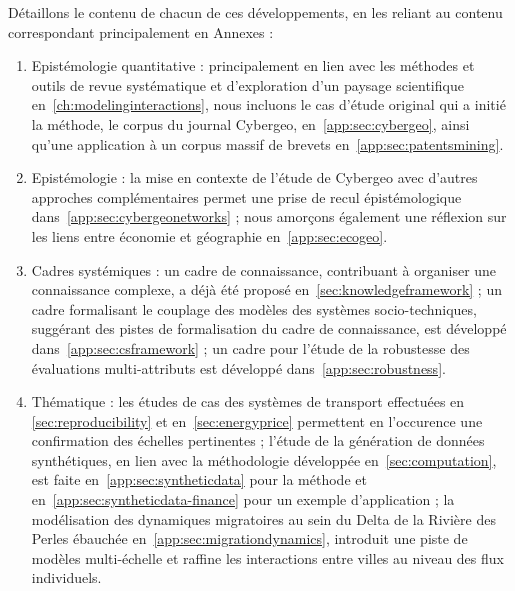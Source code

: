 Détaillons le contenu de chacun de ces développements, en les reliant au contenu correspondant principalement en Annexes :
\begin{enumerate}
	\item Epistémologie quantitative : principalement en lien avec les méthodes et outils de revue systématique et d'exploration d'un paysage scientifique en~\ref{ch:modelinginteractions}, nous incluons le cas d'étude original qui a initié la méthode, le corpus du journal Cybergeo, en~\ref{app:sec:cybergeo}, ainsi qu'une application à un corpus massif de brevets en~\ref{app:sec:patentsmining}.
	\item Epistémologie : la mise en contexte de l'étude de Cybergeo avec d'autres approches complémentaires permet une prise de recul épistémologique dans~\ref{app:sec:cybergeonetworks} ; nous amorçons également une réflexion sur les liens entre économie et géographie en~\ref{app:sec:ecogeo}.
	\item Cadres systémiques : un cadre de connaissance, contribuant à organiser une connaissance complexe, a déjà été proposé en~\ref{sec:knowledgeframework} ; un cadre formalisant le couplage des modèles des systèmes socio-techniques, suggérant des pistes de formalisation du cadre de connaissance, est développé dans~\ref{app:sec:csframework} ; un cadre pour l'étude de la robustesse des évaluations multi-attributs est développé dans~\ref{app:sec:robustness}.
	\item Thématique : les études de cas des systèmes de transport effectuées en \ref{sec:reproducibility} et en~\ref{sec:energyprice} permettent en l'occurence une confirmation des échelles pertinentes ; l'étude de la génération de données synthétiques, en lien avec la méthodologie développée en~\ref{sec:computation}, est faite en~\ref{app:sec:syntheticdata} pour la méthode et en~\ref{app:sec:syntheticdata-finance} pour un exemple d'application ; la modélisation des dynamiques migratoires au sein du Delta de la Rivière des Perles ébauchée en~\ref{app:sec:migrationdynamics}, introduit une piste de modèles multi-échelle et raffine les interactions entre villes au niveau des flux individuels.
\end{enumerate}


